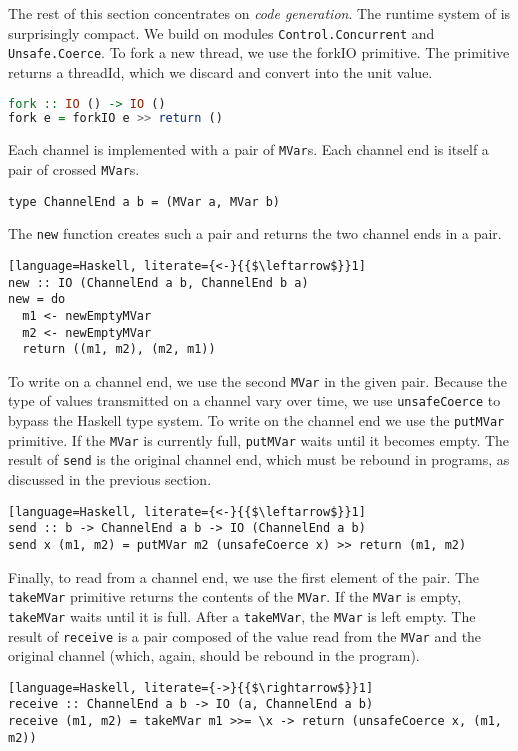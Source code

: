 The rest of this section concentrates on \emph{code generation}.
%
The runtime system of \freest{} is surprisingly compact. We build on
modules \lstinline|Control.Concurrent| and
\lstinline|Unsafe.Coerce|.
%
To fork a new thread, we use the forkIO primitive. The primitive
returns a threadId, which we discard and convert into the unit value.
%
\begin{lstlisting}[language=Haskell]
fork :: IO () -> IO ()
fork e = forkIO e >> return ()
\end{lstlisting}

Each channel is implemented with a pair of \lstinline|MVar|s. Each
channel end is itself a pair of crossed \lstinline|MVar|s.
%
\begin{lstlisting}
type ChannelEnd a b = (MVar a, MVar b)
\end{lstlisting}

The \lstinline|new| function creates such a pair and returns the two
channel ends in a pair.
%
\begin{lstlisting}[language=Haskell, literate={<-}{{$\leftarrow$}}1]
new :: IO (ChannelEnd a b, ChannelEnd b a)
new = do
  m1 <- newEmptyMVar
  m2 <- newEmptyMVar
  return ((m1, m2), (m2, m1))
\end{lstlisting}

To write on a channel end, we use the second \lstinline|MVar| in the
given pair. Because the type of values transmitted on a channel vary
over time, we use \lstinline|unsafeCoerce| to bypass the Haskell type
system. To write on the channel end we use the \lstinline|putMVar|
primitive. If the \lstinline|MVar| is currently full,
\lstinline|putMVar| waits until it becomes empty.  The result of
\lstinline|send| is the original channel end, which must be rebound in
programs, as discussed in the previous section.
%
\begin{lstlisting}[language=Haskell, literate={<-}{{$\leftarrow$}}1]
send :: b -> ChannelEnd a b -> IO (ChannelEnd a b)
send x (m1, m2) = putMVar m2 (unsafeCoerce x) >> return (m1, m2)
\end{lstlisting}

Finally, to read from a channel end, we use the first element of the
pair. The \lstinline|takeMVar| primitive returns the contents of the
\lstinline|MVar|. If the \lstinline|MVar| is empty,
\lstinline|takeMVar| waits until it is full. After a
\lstinline|takeMVar|, the \lstinline|MVar| is left empty. The result
of \lstinline|receive| is a pair composed of the value read from the
\lstinline|MVar| and the original channel (which, again, should be
rebound in the program).
%
\begin{lstlisting}[language=Haskell, literate={->}{{$\rightarrow$}}1]
receive :: ChannelEnd a b -> IO (a, ChannelEnd a b)
receive (m1, m2) = takeMVar m1 >>= \x -> return (unsafeCoerce x, (m1, m2))
\end{lstlisting}

